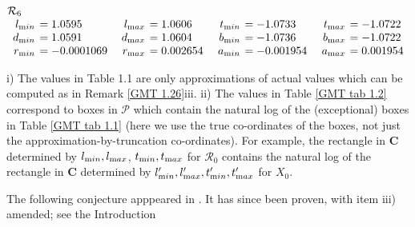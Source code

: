 \begin{table}
\begin{small}
$$\begin{array}{rlrlrlrl}
\noalign{\noindent  ${\mathcal R}_6$}
\noalign{\vskip2pt}
l_{\textrm min} &\hskip-6pt =  1.0595&\enspace    l_{\textrm max} &\hskip-6pt =  1.0606&\enspace   
t_{\textrm min} &\hskip-6pt =  -1.0733&\enspace    t_{\textrm max} &\hskip-6pt =  -1.0722\\
d_{\textrm min} &\hskip-6pt =  1.0591&  d_{\textrm max}
&\hskip-6pt =  1.0604&   b_{\textrm min} &\hskip-6pt =  -1.0736&  b_{\textrm max} &\hskip-6pt =  -1.0722\\
r_{\textrm min} &\hskip-6pt =  -0.0001069& 
r_{\textrm max} &\hskip-6pt =  0.002654&   a_{\textrm min} &\hskip-6pt =  -0.001954&  a_{\textrm max} &\hskip-6pt =  0.001954\end{array}$$
\end{small}
\end{table}

\begin{remarks}\label{GMT 1.30}
i)  The values in Table 1.1 are only 
	approximations of actual values which can be computed as in Remark \ref{GMT 1.26}iii.
	ii)  The values in Table \ref{GMT tab 1.2} correspond to boxes in ${\mathcal P}$ which contain the natural log of the (exceptional) boxes in Table \ref{GMT tab 1.1} (here we use the true co-ordinates of the boxes, not just the approximation-by-truncation co-ordinates).  
For example,
 the rectangle in ${\mathbf C}$ determined by $l_{\textrm min}, l_{\textrm max}$,
$t_{\textrm min}, t_{\textrm max}$ for ${\mathcal R}_0$ contains the natural log of the rectangle in ${\mathbf C}$ determined by $l'_{\textrm min},
l'_{\textrm max}, t'_{\textrm min}, t'_{\textrm max}$ for $X_0$.  
\end{remarks}

The following conjecture apppeared in \cite{GMT}. It has since been proven,
with item iii) amended; see
the Introduction %

